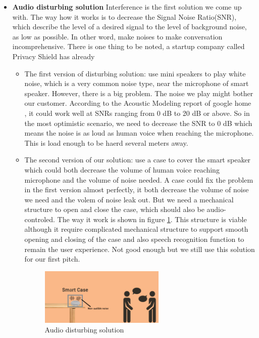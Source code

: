 \documentclass[12pt,twoside]{article}
\begin{document}
\begin{itemize}
\item \textbf{Audio disturbing solution} Interference is the first solution we come up with. The way how it works is to decrease the Signal Noise Ratio(SNR), 
which describe the level of a desired signal to the level of background noise, as low as possible. In other word, make noises to make conversation 
incomprehensive. There is one thing to be noted, a startup company called Privacy Shield has already 
\begin{itemize}
\item  The first version of disturbing solution: use mini speakers to play white noise, which is a very common noise type, near the 
microphone of smart speaker. However, there is a big problem. The noise we play might bother our customer. According to the Acoustic Modeling report
of google home \cite{46130}, it could work well at SNRs ranging from 0 dB to 20 dB or above. So in the most optimistic scenario, we need to decrease the SNR 
to 0 dB which means the noise is as loud as human voice when reaching the microphone. This is load enough to be haerd several meters away.
\item The second version of our solution: use a case to cover the smart speaker which could both decrease the volume of human voice reaching microphone and 
the volume of noise needed. A case could fix the problem in the first version almost perfectly, it both decrease the volume of noise we need and the volem of 
noise leak out. But we need a mechanical structure to open and close the case, which should also be audio-controled. The way it work is shown in 
figure \ref{fig:Audio disturbing solution}. This structure is viable although it require complicated mechanical structure to support smooth opening and 
closing of the case and also speech recognition function to remain the user experience. Not good enough but we still use this solution for our first pitch.
\begin{figure}[!htb]
\centering
\includegraphics[width=0.6\textwidth]{case.png}
\caption{Audio disturbing solution}
\label{fig:Audio disturbing solution}
\end{figure}
\end{itemize}

\end{itemize}
\end{document}
